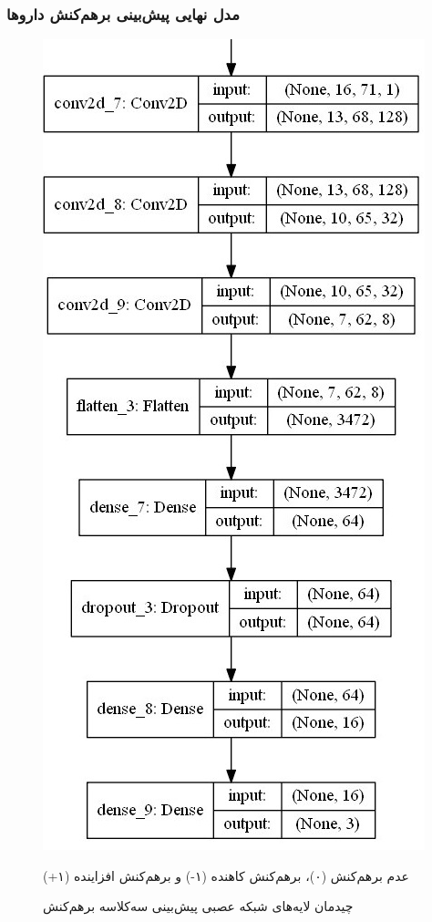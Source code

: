 \subsubsection{مدل نهایی پیش‌بینی برهم‌کنش داروها}

\begin{figure}
	\centering
	\includegraphics[scale=0.66]{section3/Triple_model.jpg}
	\caption{
چیدمان لایه‌های شبکه عصبی
پیش‌بینی سه‌کلاسه برهم‌کنش
}
عدم برهم‌کنش (۰)، برهم‌کنش کاهنده (۱-) و برهم‌کنش افزاینده (۱+)
	\label{Triple_model}
\end{figure}
